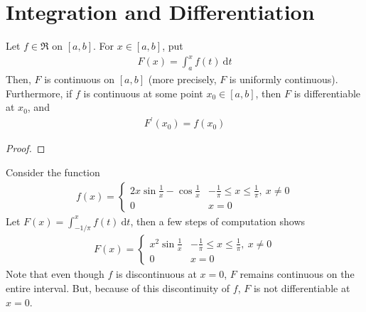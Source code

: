 \documentclass[thmcnt=section, 12pt]{elegantbook}
\begin{document}

\begin{theorem} \label{thm:28}
\end{theorem}


\section{Integration and Differentiation}


\begin{theorem} \label{thm:3}
    Let $f \in \mathfrak{R}$ on $[a, b]$. For $x \in [a, b]$, put 
    \begin{align*}
        F(x) = \int_a^x f(t) \ \mathrm{d} t
    \end{align*}
    Then, $F$ is continuous on $[a, b]$ (more precisely, $F$  is uniformly continuous). Furthermore, if $f$ is continuous at some point $x_0 \in [a, b]$, then $F$ is differentiable at $x_0$, and 
    \begin{align*}
        F^\prime(x_0) = f(x_0)
    \end{align*}
\end{theorem}

\begin{proof}
\end{proof}

\begin{example}
    Consider the function 
    \begin{align*}
        f(x) = \begin{cases}
            2x \sin \frac{1}{x} - \cos \frac{1}{x} &-\frac{1}{\pi} \leq x \leq \frac{1}{\pi}, \ x \neq 0 \\ 
            0 &x = 0
        \end{cases}
    \end{align*}
    Let $F(x) = \int_{-1/\pi}^{x} f(t) \ \mathrm{d} t$, then a few steps of computation shows 
    \begin{align*}
        F(x) = \begin{cases}
            x^2 \sin \frac{1}{x}  &-\frac{1}{\pi} \leq x \leq \frac{1}{\pi}, \ x \neq 0 \\ 
            0 &x = 0
        \end{cases}
    \end{align*}
    Note that even though $f$ is discontinuous at $x = 0$, $F$ remains continuous on the entire interval. But, because of this discontinuity of $f$,  $F$ is not differentiable at $x=0$.
\end{example}
\end{document}
